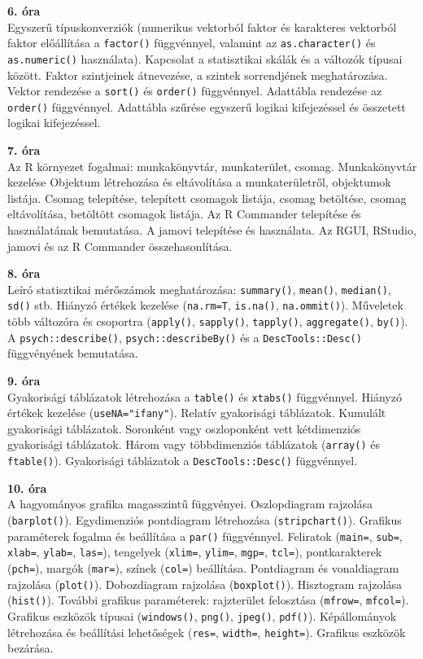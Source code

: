\documentclass[
]{book}
\begin{document}
\textbf{6. óra}\\
Egyszerű típuskonverziók (numerikus vektorból faktor és karakteres vektorból faktor előállítása a \texttt{factor()} függvénnyel, valamint az \texttt{as.character()} és \texttt{as.numeric()} használata). Kapcsolat a statisztikai skálák és a változók típusai között. Faktor szintjeinek átnevezése, a szintek sorrendjének meghatározása. Vektor rendezése a \texttt{sort()} és \texttt{order()} függvénnyel. Adattábla rendezése az \texttt{order()} függvénnyel. Adattábla szűrése egyszerű logikai kifejezéssel és összetett logikai kifejezéssel.

\textbf{7. óra}\\
Az R környezet fogalmai: munkakönyvtár, munkaterület, csomag. Munkakönyvtár kezelése Objektum létrehozása és eltávolítása a munkaterületről, objektumok listája. Csomag telepítése, telepített csomagok listája, csomag betöltése, csomag eltávolítása, betöltött csomagok listája. Az R Commander telepítése és használatának bemutatása. A jamovi telepítése és használata. Az RGUI, RStudio, jamovi és az R Commander összehasonlítása.

\textbf{8. óra}\\
Leíró statisztikai mérőszámok meghatározása: \texttt{summary()}, \texttt{mean()}, \texttt{median()}, \texttt{sd()} stb. Hiányzó értékek kezelése (\texttt{na.rm=T}, \texttt{is.na()}, \texttt{na.ommit()}). Műveletek több változóra és csoportra (\texttt{apply()}, \texttt{sapply()}, \texttt{tapply()}, \texttt{aggregate()}, \texttt{by()}). A \texttt{psych::describe()}, \texttt{psych::describeBy()} és a \texttt{DescTools::Desc()} függvényének bemutatása.

\textbf{9. óra}\\
Gyakorisági táblázatok létrehozása a \texttt{table()} és \texttt{xtabs()} függvénnyel. Hiányzó értékek kezelése (\texttt{useNA="ifany"}). Relatív gyakorisági táblázatok. Kumulált gyakorisági táblázatok. Soronként vagy oszloponként vett kétdimenziós gyakorisági táblázatok. Három vagy többdimenziós táblázatok (\texttt{array()} és \texttt{ftable()}). Gyakorisági táblázatok a \texttt{DescTools::Desc()} függvénnyel.

\textbf{10. óra}\\
A hagyományos grafika magasszintű függvényei. Oszlopdiagram rajzolása (\texttt{barplot()}). Egydimenziós pontdiagram létrehozása (\texttt{stripchart()}). Grafikus paraméterek fogalma és beállítása a \texttt{par()} függvénnyel. Feliratok (\texttt{main=}, \texttt{sub=}, \texttt{xlab=}, \texttt{ylab=}, \texttt{las=}), tengelyek (\texttt{xlim=}, \texttt{ylim=}, \texttt{mgp=}, \texttt{tcl=}), pontkarakterek (\texttt{pch=}), margók (\texttt{mar=}), színek (\texttt{col=}) beállítása. Pontdiagram és vonaldiagram rajzolása (\texttt{plot()}). Dobozdiagram rajzolása (\texttt{boxplot()}). Hisztogram rajzolása (\texttt{hist()}). További grafikus paraméterek: rajzterület felosztása (\texttt{mfrow=}, \texttt{mfcol=}). Grafikus eszközök típusai (\texttt{windows()}, \texttt{png()}, \texttt{jpeg()}, \texttt{pdf()}). Képállományok létrehozása és beállítási lehetőségek (\texttt{res=}, \texttt{width=}, \texttt{height=}). Grafikus eszközök bezárása.
\end{document}

